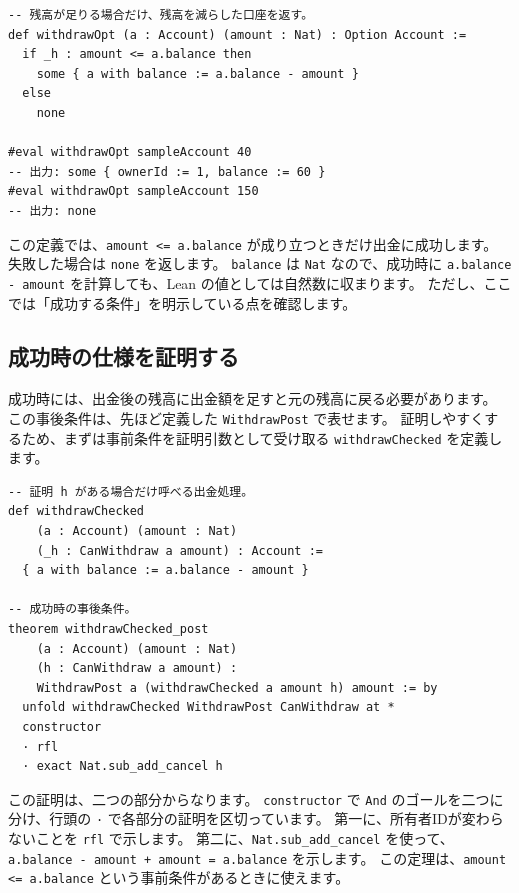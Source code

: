 \begin{listing}[htbp]
\begin{verbatim}
-- 残高が足りる場合だけ、残高を減らした口座を返す。
def withdrawOpt (a : Account) (amount : Nat) : Option Account :=
  if _h : amount <= a.balance then
    some { a with balance := a.balance - amount }
  else
    none

#eval withdrawOpt sampleAccount 40
-- 出力: some { ownerId := 1, balance := 60 }
#eval withdrawOpt sampleAccount 150
-- 出力: none
\end{verbatim}
\caption{\texttt{withdrawOpt}}
\label{lst:ch10_withdraw_option}
\end{listing}

この定義では、\texttt{amount <= a.balance} が成り立つときだけ出金に成功します。
失敗した場合は \texttt{none} を返します。
\texttt{balance} は \texttt{Nat} なので、成功時に \texttt{a.balance - amount} を計算しても、Lean の値としては自然数に収まります。
ただし、ここでは「成功する条件」を明示している点を確認します。

\subsection{成功時の仕様を証明する}

成功時には、出金後の残高に出金額を足すと元の残高に戻る必要があります。
この事後条件は、先ほど定義した \texttt{WithdrawPost} で表せます。
証明しやすくするため、まずは事前条件を証明引数として受け取る \texttt{withdrawChecked} を定義します。

\begin{listing}[htbp]
\begin{verbatim}
-- 証明 h がある場合だけ呼べる出金処理。
def withdrawChecked
    (a : Account) (amount : Nat)
    (_h : CanWithdraw a amount) : Account :=
  { a with balance := a.balance - amount }

-- 成功時の事後条件。
theorem withdrawChecked_post
    (a : Account) (amount : Nat)
    (h : CanWithdraw a amount) :
    WithdrawPost a (withdrawChecked a amount h) amount := by
  unfold withdrawChecked WithdrawPost CanWithdraw at *
  constructor
  · rfl
  · exact Nat.sub_add_cancel h
\end{verbatim}
\caption{\texttt{withdrawChecked\_post}}
\label{lst:ch10_withdraw_checked}
\end{listing}

この証明は、二つの部分からなります。
\texttt{constructor} で \texttt{And} のゴールを二つに分け、行頭の \texttt{·} で各部分の証明を区切っています。
第一に、所有者IDが変わらないことを \texttt{rfl} で示します。
第二に、\texttt{Nat.sub\_add\_cancel} を使って、\texttt{a.balance - amount + amount = a.balance} を示します。
この定理は、\texttt{amount <= a.balance} という事前条件があるときに使えます。

